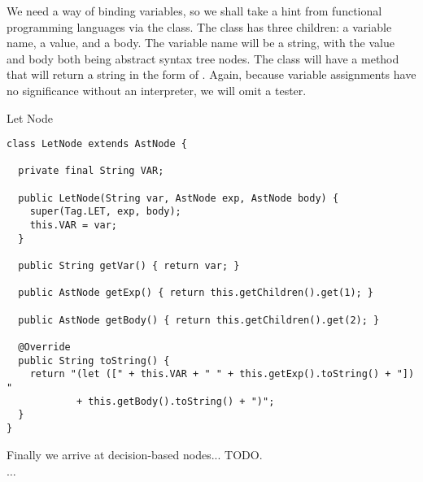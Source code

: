 We need a way of binding variables, so we shall take a hint from functional programming languages via the  class. The  class has three children: a variable name, a value, and a body. The variable name will be a string, with the value and body both being abstract syntax tree nodes. The  class will have a  method that will return a string in the form of . Again, because variable assignments have no significance without an interpreter, we will omit a tester.

\begin{cl}{Let Node}
\begin{lstlisting}[language=MyJava]
class LetNode extends AstNode {

  private final String VAR;

  public LetNode(String var, AstNode exp, AstNode body) {
    super(Tag.LET, exp, body);
    this.VAR = var;
  }

  public String getVar() { return var; }

  public AstNode getExp() { return this.getChildren().get(1); }

  public AstNode getBody() { return this.getChildren().get(2); }

  @Override
  public String toString() {
    return "(let ([" + this.VAR + " " + this.getExp().toString() + "]) " 
            + this.getBody().toString() + ")";
  }
}
\end{lstlisting}
\end{cl}

Finally we arrive at decision-based nodes... TODO.

$\ldots$


